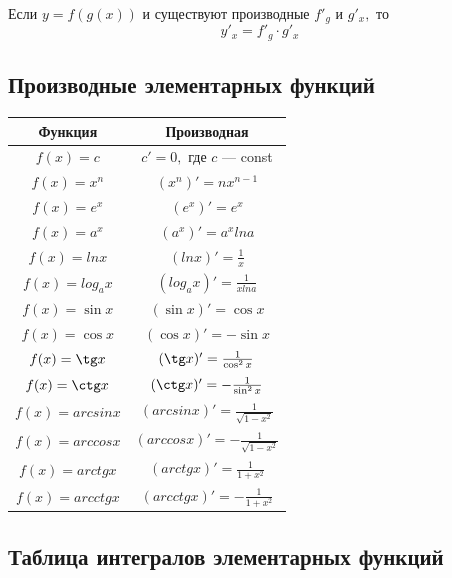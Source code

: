 \documentclass[a4paper, 14pt]{extarticle}
\begin{document}
{Если $y=f(g(x))$ и существуют производные $f'_g$ и $g'_x,$ то
$$y'_x=f'_g\cdot g'_x$$

\subsection{Производные элементарных функций}

\begin{center}
{\setlength{\extrarowheight}{5pt}
\begin{tabular}{|c|c|}
\hline 
\rowcolor{Gray}
Функция & Производная \\[5pt]
\hline
$f(x)=c$ & $c'=0,$ где $c$ --- const \\[5pt]
\hline
$f(x)=x^n$ & $(x^n)'=nx^{n-1}$ \\[5pt]
\hline
$f(x)=e^x$ & $(e^x)'=e^x$ \\[5pt]
\hline
$f(x)=a^x$ & $(a^x)'=a^x lna$ \\[5pt]
\hline
$f(x)=lnx$ & $(lnx)'=\frac{1}{x}$ \\[5pt]
\hline
$f(x)=log_ax$ & $(log_ax)'=\frac{1}{xlna}$ \\[5pt]
\hline
$f(x)=\sin x$ & $(\sin x)'=\cos x$ \\[5pt]
\hline
$f(x)=\cos x$ & $(\cos x)'=-\sin x$ \\[5pt]
\hline
$f(x)=\tg x$ & $(\tg x)'=\frac{1}{\cos^2 x}$ \\[5pt]
\hline
$f(x)=\ctg x$ & $(\ctg x)'= -\frac{1}{\sin^2 x}$ \\[5pt]
\hline
$f(x)=arcsin x$ & $(arcsin x)'=\frac{1}{\sqrt{1-x^2}}$ \\[5pt]
\hline
$f(x)=arccos x$ & $(arccos x)'=-\frac{1}{\sqrt{1-x^2}}$ \\[5pt]
\hline
$f(x)=arctg x$ & $(arctg x)'=\frac{1}{1+x^2}$ \\[5pt]
\hline
$f(x)=arcctg x$ & $(arcctg x)'=-\frac{1}{1+x^2}$ \\[5pt]
\hline
\end{tabular} 
}
\end{center}



\subsection{Таблица интегралов элементарных функций}

}
\end{document}
